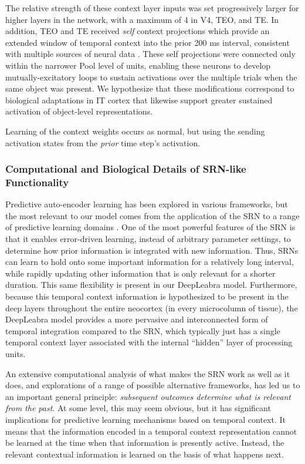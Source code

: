 The relative strength of these context layer inputs was set progressively larger for higher layers in the network, with a maximum of 4 in V4, TEO, and TE.  In addition, TEO and TE received \emph{self} context projections which provide an extended window of temporal context into the prior 200 ms interval, consistent with multiple sources of neural data \citep{ChaudhuriKnoblauchGarielEtAl15}.  These self projections were connected only within the narrower Pool level of units, enabling these neurons to develop mutually-excitatory loops to sustain activations over the multiple trials when the same object was present.  We hypothesize that these modifications correspond to biological adaptations in IT cortex that likewise support greater sustained activation of object-level representations.

Learning of the context weights occurs as normal, but using the sending activation states from the {\em prior} time step's activation.

\subsubsection{Computational and Biological Details of SRN-like Functionality}

Predictive auto-encoder learning has been explored in various frameworks, but the most relevant to our model comes from the application of the SRN to a range of predictive learning domains \citep{Elman90,ElmanBatesKarmiloff-SmithEtAl96}.  One of the most powerful features of the SRN is that it enables error-driven learning, instead of arbitrary parameter settings, to determine how prior information is integrated with new information.  Thus, SRNs can learn to hold onto some important information for a relatively long interval, while rapidly updating other information that is only relevant for a shorter duration.  This same flexibility is present in our DeepLeabra model.  Furthermore, because this temporal context information is hypothesized to be present in the deep layers throughout the entire neocortex (in every microcolumn of tissue), the DeepLeabra model provides a more pervasive and interconnected form of temporal integration compared to the SRN, which typically just has a single temporal context layer associated with the internal ``hidden'' layer of processing units.

An extensive computational analysis of what makes the SRN work as well as it does, and explorations of a range of possible alternative frameworks, has led us to an important general principle: {\em subsequent outcomes determine what is relevant from the past}.  At some level, this may seem obvious, but it has significant implications for predictive learning mechanisms based on temporal context.  It means that the information encoded in a temporal context representation cannot be learned at the time when that information is presently active.  Instead, the relevant contextual information is learned on the basis of what happens next.

